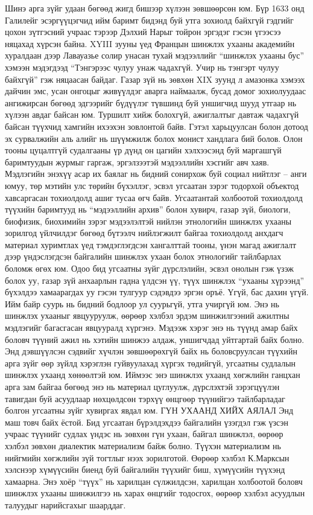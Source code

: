 Шинэ арга зүйг удаан бөгөөд жигд бишээр хүлээн зөвшөөрсөн юм. Бүр 1633 онд Галилейг эсэргүүцэгчид ийм баримт бидэнд буй утга зохиолд байхгүй гэдгийг цохон зүтгэсний учраас тэрээр Дэлхий Нарыг тойрон эргэдэг гэсэн үгээсээ няцахад хүрсэн байна. XYIII зууны үед Францын шинжлэх ухааны академийн хуралдаан дээр Лавауазье солир унасан тухай мэдээллийг “шинжлэх ухааны бус” хэмээн мэдэгдээд “Тэнгэрээс чулуу унаж чадахгүй. Учир нь тэнгэрт чулуу байхгүй” гэж няцаасан байдаг.
Газар зүй нь зөвхөн XIX зуунд л амазонка хэмээх дайчин эмс, усан онгоцыг живүүлдэг аварга наймаалж, бусад домог зохиолуудаас ангижирсан бөгөөд эдгээрийг бүдүүлэг түвшинд буй уншигчид шууд утгаар нь хүлээн авдаг байсан юм. Туршилт хийж болохгүй, ажиглалтыг давтаж чадахгүй байсан түүхчид хамгийн ихээхэн зовлонтой байв. Гэтэл харьцуулсан болон дотоод эх сурвалжийн аль алийг нь шүүмжилж болох монист хандлага бий болов. Олон тооны цуцалтгүй судалгааны үр дүнд он цагийн хэлхээсэнд буй маргашгүй баримтуудын журмыг гаргаж, эргэлзээтэй мэдээллийн хэсгийг авч хаяв. Мэдлэгийн энэхүү асар их баялаг нь бидний сонирхож буй социал нийтлэг – анги юмуу, төр мэтийн улс төрийн бүхэллэг, эсвэл угсаатан зэрэг тодорхой объектод хавсаргасан тохиолдолд ашиг тусаа өгч байв. Угсаатантай холбоотой тохиолдолд түүхийн баримтууд нь “мэдээллийн архив” болон хувирч, газар зүй, биологи, биофизик, биохимийн зэрэг мэдээлэлтэй нийлэн этнологийн шинжлэх ухааны зорилгод үйлчилдэг бөгөөд бүтээлч нийлэгжилт байгаа тохиолдолд анхдагч материал хуримтлах үед тэмдэглэгдсэн хангалттай тооны, үнэн магад ажиглалт дээр үндэслэгдсэн байгалийн шинжлэх ухаан болох этнологийг тайлбарлах боломж өгөх юм.
Одоо бид угсаатны зүйг дүрслэлийн, эсвэл онолын гэж үзэж болох уу, газар зүй анхаарлын гадна үлдсэн үү, түүх шинжлэх “ухааны хүрээнд” бүхэлдээ хамаарагдах уу гэсэн тулгуур сэдэвдээ эргэн оръё. Үгүй, бас дахин үгүй. Ийм байр суурь нь бидний бодлоор ул суурьгүй, утга учиргүй юм. Энэ нь шинжлэх ухааныг явцууруулж, өөрөөр хэлбэл эрдэм шинжилгээний ажилтны мэдлэгийг багасгасан явцууралд хүргэнэ. Мэдээж хэрэг энэ нь түүнд амар байх боловч түүний ажил нь хэтийн шинжээ алдаж, уншигчдад уйтгартай байх болно. Энд дэвшүүлсэн сэдвийг хүчлэн зөвшөөрөхгүй байх нь боловсруулсан түүхийн арга зүйг өөр зүйлд хэрэглэн гуйвуулахад хүргэх төдийгүй, угсаатны судлалын шинжлэх ухаанд хөнөөлтэй юм. Иймээс энэ шинжлэх ухаанд хөгжлийн ганцхан арга зам байгаа бөгөөд энэ нь материал цуглуулж, дүрслэхтэй зэрэгцүүлэн тавигдан буй асуудлаар нөхцөлдсөн тэрхүү өнцгөөр түүнийгээ тайлбарладаг болгон угсаатны зүйг хувиргах явдал юм.
ГҮН УХААНД ХИЙХ АЯЛАЛ
Энд маш товч байх ёстой. Бид угсаатан бүрэлдэхдээ байгалийн үзэгдэл гэж үзсэн учраас түүнийг судлах үндэс нь зөвхөн гүн ухаан, байгал шинжлэл, өөрөөр хэлбэл зөвхөн диалектик материализм байж болно. Түүхэн материализм нь нийгмийн хөгжлийн зүй тогтлыг нээх зорилготой. Өөрөөр хэлбэл К.Марксын хэлснээр хүмүүсийн биенд буй байгалийн түүхийг биш, хүмүүсийн түүхэнд хамаарна. Энэ хоёр “түүх” нь харилцан сүлжилдсэн, харилцан холбоотой боловч шинжлэх ухааны шинжилгээ нь харах өнцгийг тодосгох, өөрөөр хэлбэл асуудлын талуудыг нарийсгахыг шаарддаг.
